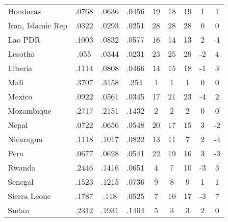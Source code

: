 {\begin{tabular}{l*{1}{cccccccc}}
Honduras                      &       .0768&       .0636&       .0456&          19&          18&          19&           1&           1\\
Iran, Islamic Rep             &       .0322&       .0293&       .0251&          28&          28&          28&           0&           0\\
Lao PDR                       &       .1003&       .0832&       .0577&          16&          14&          13&           2&          -1\\
Lesotho                       &        .055&       .0344&       .0231&          23&          25&          29&          -2&           4\\
Liberia                       &       .1114&       .0808&       .0466&          14&          15&          18&          -1&           3\\
Mali                          &       .3707&       .3158&        .254&           1&           1&           1&           0&           0\\
Mexico                        &       .0922&       .0561&       .0345&          17&          21&          23&          -4&           2\\
Mozambique                    &       .2717&       .2151&       .1432&           2&           2&           2&           0&           0\\
Nepal                         &       .0722&       .0656&       .0548&          20&          17&          15&           3&          -2\\
Nicaragua                     &       .1118&       .1017&       .0822&          13&          11&           7&           2&          -4\\
Peru                          &       .0677&       .0628&       .0541&          22&          19&          16&           3&          -3\\
Rwanda                        &       .2446&       .1416&       .0651&           4&           7&          10&          -3&           3\\
Senegal                       &       .1523&       .1215&       .0736&           9&           8&           9&           1&           1\\
Sierra Leone                  &       .1787&        .118&       .0525&           7&          10&          17&          -3&           7\\
Sudan                         &       .2312&       .1931&       .1404&           5&           3&           3&           2&           0\\

\end{tabular}}
